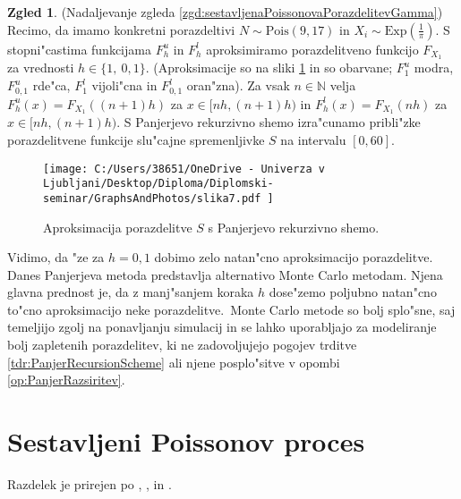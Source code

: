 \documentclass[12pt, a4paper, reqno]{amsart}
\theoremstyle{definition}
\newtheorem{zgled}[definicija]{Zgled}
\theoremstyle{plain}
\newcommand{\N}{\mathbb{N}}
\newcommand{\1}{\mathds{1}}
\newcommand{\Pois}[1]{\text{Pois}(#1)}
\begin{document}
    \begin{zgled}(Nadaljevanje zgleda \ref{zgd:sestavljenaPoissonovaPorazdelitevGamma}) Recimo, da imamo
        konkretni porazdeltivi $N\sim\Pois{9{,}17}$ in $X_i\sim\text{Exp}(\frac{1}{\pi})$. S stopni"castima funkcijama
        $F^u_h$ in $F_h^l$ aproksimiramo porazdelitveno funkcijo $F_{X_1}$ za vrednosti $h \in \{1, \ 0{,}1\}$. 
        (Aproksimacije so na sliki \ref{fig:slika7} in so obarvane;  $F^u_{1}$ modra, $F^u_{0{,}1}$ 
        rde"ca, $F^l_{1}$ vijoli"cna in $F^l_{0{,}1}$ oran"zna).
        Za vsak $n\in\N$ velja $F^u_h(x) = F_{X_1}((n+1)h)$ za $x\in\bigl[nh, (n+1)h\bigr)$ in 
        $F^l_h(x) = F_{X_1}(nh)$ za $x\in\bigl[nh, (n+1)h\bigr)$.
        S Panjerjevo rekurzivno shemo izra"cunamo pribli"zke porazdelitvene funkcije slu"cajne 
        spremenljivke $S$ na intervalu $[0, 60]$.  
 
        \begin{figure}[h!]
            \begin{center}
                \texttt{[image: 
                    C:/Users/38651/OneDrive - Univerza v Ljubljani/Desktop/Diploma/Diplomski-seminar/GraphsAndPhotos/slika7.pdf
                ]}
                \caption{Aproksimacija porazdelitve $S$ s Panjerjevo rekurzivno shemo.}
                \label{fig:slika7}
            \end{center}
        \end{figure}
        
    \pagebreak
    Vidimo, da "ze za $h = 0{,}1$ dobimo zelo natan"cno aproksimacijo porazdelitve. Danes 
    Panjerjeva metoda predstavlja alternativo Monte Carlo metodam. Njena glavna prednost 
    je, da z manj"sanjem koraka $h$ dose"zemo poljubno natan"cno to"cno aproksimacijo neke porazdelitve.\ 
    Monte Carlo metode so bolj splo"sne, saj temeljijo zgolj na ponavljanju simulacij in se lahko uporabljajo za modeliranje bolj zapletenih 
    porazdelitev, ki ne zadovoljujejo pogojev trditve \ref{tdr:PanjerRecursionScheme} ali njene posplo"sitve
    v opombi \ref{op:PanjerRazsiritev}. 

    \label{zgd:PanjerExp}  
    \end{zgled}

    \newpage


\section{Sestavljeni Poissonov proces}

    \noindent
    Razdelek je prirejen po \cite{1}, \cite{2}, in \cite{3}.
\end{document}
